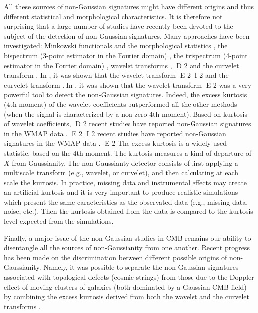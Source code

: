 All these sources of non-Gaussian signatures might have different origins and thus different statistical and morphological
characteristics. It is therefore not surprising that a large number of studies have recently been devoted to the subject 
of the detection of non-Gaussian signatures. Many approaches have been investigated: Minkowski functionals and the morphological 
statistics \citep{gauss:novikov00,gauss:shandarin02}, the bispectrum (3-point estimator in the Fourier domain) 
\citep{gauss:bromley99,gauss:verde00,gauss:phillips01}, the trispectrum (4-point estimator in the Fourier domain) \citep{gauss:kunz01}, 
wavelet transforms \citep{gauss:aghanim99,gauss:forni99,gauss:hobson99,gauss:barreiro01,gauss:cayon01,gauss:jewell01,starck:sta03_1}, 
D 2
and the curvelet transform \citep{starck:sta03_1}. In \citet{gauss:aghanim03,starck:sta03_1}, it was shown that the wavelet transform 
E 2
I 2
and the curvelet transform \citep{starck:sta03_1}. In \citep{gauss:aghanim03,starck:sta03_1}, it was shown that the wavelet transform 
E 2
was a very powerful tool to detect the non-Gaussian signatures. Indeed, the excess kurtosis (4th moment) of the wavelet coefficients 
outperformed all the other methods (when the signal is characterized by a non-zero 4th moment). Based on kurtosis of wavelet coefficients, 
D 2
recent studies have reported non-Gaussian signatures in the WMAP data \citep{gauss:vielva04,gauss:pia04,gauss:cruz05}.
E 2
I 2
recent studies have reported non-Gaussian signatures in the WMAP data \citep{wave:vielva04,gauss:pia04,gauss:cruz05}.
E 2
The excess kurtosis is a widely used statistic, based on the 4th moment. 
The kurtosis measures a kind of departure of $X$ from Gaussianity. The non-Gaussianty detector consists of first applying 
a multiscale transform (e.g., wavelet, or curvelet), and then calculating at each scale the kurtosis. In practice, missing 
data and instrumental effects may create an artificial kurtosis and it is very important to produce realistic simulations 
which present the same caracteristics as the observated data (e.g., missing data, noise, etc.). Then the kurtosis obtained 
from the data is compared to the kurtosis level expected from the simulations.
 
Finally, a major issue of the non-Gaussian studies in CMB remains our ability to disentangle all the sources of non-Gaussianity 
from one another. Recent progress has been made on the discrimination between different possible origins of non-Gaussianity. 
Namely, it was possible to separate the non-Gaussian signatures associated with topological defects (cosmic strings) from those 
due to the Doppler effect of moving clusters of galaxies (both dominated by a Gaussian CMB field) by combining the excess kurtosis 
derived from both the wavelet and the curvelet transforms \citep{starck:sta03_1}. 

